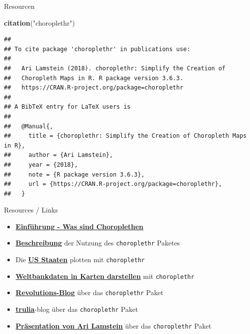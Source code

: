 \documentclass[ignorenonframetext,]{beamer}
\newenvironment{Shaded}{\begin{snugshade}}{\end{snugshade}}
\newcommand{\KeywordTok}[1]{\textcolor[rgb]{0.13,0.29,0.53}{\textbf{#1}}}
\newcommand{\NormalTok}[1]{#1}
\newcommand{\StringTok}[1]{\textcolor[rgb]{0.31,0.60,0.02}{#1}}
\begin{document}
\begin{frame}[fragile]{Resourcen}
\protect\hypertarget{resourcen}{}

\begin{Shaded}
\begin{Highlighting}[]
\KeywordTok{citation}\NormalTok{(}\StringTok{"choroplethr"}\NormalTok{)}
\end{Highlighting}
\end{Shaded}

\begin{verbatim}
## 
## To cite package 'choroplethr' in publications use:
## 
##   Ari Lamstein (2018). choroplethr: Simplify the Creation of
##   Choropleth Maps in R. R package version 3.6.3.
##   https://CRAN.R-project.org/package=choroplethr
## 
## A BibTeX entry for LaTeX users is
## 
##   @Manual{,
##     title = {choroplethr: Simplify the Creation of Choropleth Maps in R},
##     author = {Ari Lamstein},
##     year = {2018},
##     note = {R package version 3.6.3},
##     url = {https://CRAN.R-project.org/package=choroplethr},
##   }
\end{verbatim}

\end{frame}

\begin{frame}[fragile]{Resources / Links}
\protect\hypertarget{resources-links}{}

\begin{itemize}
\item
  \href{https://cran.r-project.org/web/packages/choroplethr/vignettes/a-introduction.html}{\textbf{Einführung
  - Was sind Choroplethen}}
\item
  \href{http://radar.oreilly.com/2014/01/new-choropleth-package-in-r.html}{\textbf{Beschreibung}}
  der Nutzung des \texttt{choroplethr} Paketes
\item
  Die
  \href{https://cran.r-project.org/web/packages/choroplethr/vignettes/b-state-choropleth.html}{\textbf{US
  Staaten}} plotten mit \texttt{choroplethr}
\item
  \href{https://cran.r-project.org/web/packages/choroplethr/vignettes/f-world-bank-data.html}{\textbf{Weltbankdaten
  in Karten darstellen}} mit \texttt{choroplethr}
\item
  \href{http://blog.revolutionanalytics.com/2014/01/easy-data-maps-with-r-the-choroplethr-package-.html}{\textbf{Revolutions-Blog}}
  über das \texttt{choroplethr} Paket
\item
  \href{http://www.trulia.com/tech/2014/01/15/the-choroplethr-package-for-r/}{\textbf{trulia}}-blog
  über das \texttt{choroplethr} Paket
\item
  \href{http://www.r-bloggers.com/slides-for-my-upcoming-talk-mapping-census-data-in-r/}{\textbf{Präsentation
  von Ari Lamstein}} über das \texttt{choroplethr} Paket
\end{itemize}

\end{frame}
\end{document}
